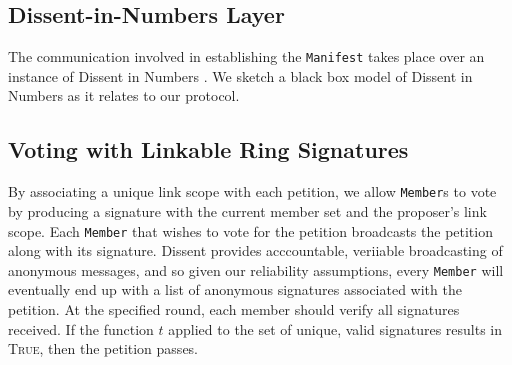 \subsection{Dissent-in-Numbers Layer}
The communication involved in establishing the \texttt{Manifest} takes place
over an instance of Dissent in Numbers \cite{din}. We sketch a
black box model of Dissent in Numbers as it relates to our protocol.

\subsection{Voting with Linkable Ring Signatures}

By associating a unique link scope with each petition, we allow \texttt{Member}s
to vote by producing a signature with the current member set and the proposer's
link scope. Each \texttt{Member} that wishes to vote for the petition broadcasts
the petition along with its signature. Dissent provides acccountable, veriiable
broadcasting of anonymous messages, and so given our reliability assumptions,
every \texttt{Member} will eventually end up with a list of anonymous signatures
associated with the petition. At the specified round, each member should verify
all signatures received. If the function $t$ applied to the set of unique, valid
signatures results in \textsc{True}, then the petition passes.


